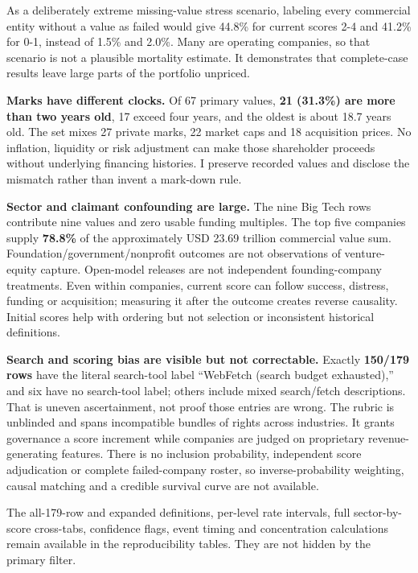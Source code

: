 As a deliberately extreme missing-value stress scenario, labeling every
commercial entity without a value as failed would give 44.8\% for
current scores 2-4 and 41.2\% for 0-1, instead of 1.5\% and 2.0\%. Many
are operating companies, so that scenario is not a plausible mortality
estimate. It demonstrates that complete-case results leave large parts
of the portfolio unpriced.

\textbf{Marks have different clocks.} Of 67 primary values, \textbf{21
(31.3\%) are more than two years old}, 17 exceed four years, and the
oldest is about 18.7 years old. The set mixes 27 private marks, 22
market caps and 18 acquisition prices. No inflation, liquidity or risk
adjustment can make those shareholder proceeds without underlying
financing histories. I preserve recorded values and disclose the
mismatch rather than invent a mark-down rule.

\textbf{Sector and claimant confounding are large.} The nine Big Tech
rows contribute nine values and zero usable funding multiples. The top
five companies supply \textbf{78.8\%} of the approximately USD 23.69
trillion commercial value sum. Foundation/government/nonprofit outcomes
are not observations of venture-equity capture. Open-model releases are
not independent founding-company treatments. Even within companies,
current score can follow success, distress, funding or acquisition;
measuring it after the outcome creates reverse causality. Initial scores
help with ordering but not selection or inconsistent historical
definitions.

\textbf{Search and scoring bias are visible but not correctable.}
Exactly \textbf{150/179 rows} have the literal search-tool label
``WebFetch (search budget exhausted),'' and six have no search-tool
label; others include mixed search/fetch descriptions. That is uneven
ascertainment, not proof those entries are wrong. The rubric is
unblinded and spans incompatible bundles of rights across industries. It
grants governance a score increment while companies are judged on
proprietary revenue-generating features. There is no inclusion
probability, independent score adjudication or complete failed-company
roster, so inverse-probability weighting, causal matching and a credible
survival curve are not available.

The all-179-row and expanded definitions, per-level rate intervals, full
sector-by-score cross-tabs, confidence flags, event timing and
concentration calculations remain available in the reproducibility
tables. They are not hidden by the primary filter.

